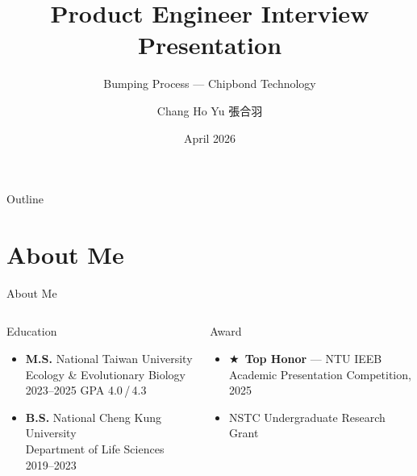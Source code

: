 \documentclass[aspectratio=169,10pt]{beamer}
\title[Bumping Product Engineer Interview]{Product Engineer Interview Presentation}
\subtitle{Bumping Process --- Chipbond Technology}
\author[Chang Ho Yu]{Chang Ho Yu \quad 張合羽}
\institute{M.S. Biological Sciences, National Taiwan University}
\date{April 2026}
\begin{document}
\begin{frame}
  \titlepage
\end{frame}

\begin{frame}{Outline}
  \tableofcontents
\end{frame}

\section{About Me}
\begin{frame}{About Me}
  \begin{columns}[T]
      \begin{block}{Education}
        \small
        \begin{itemize}
          \item \textbf{M.S.} National Taiwan University\\
                Ecology \& Evolutionary Biology\\
                {\footnotesize 2023--2025 \quad GPA 4.0\,/\,4.3}
          \item \textbf{B.S.} National Cheng Kung University\\
                Department of Life Sciences\\
                {\footnotesize 2019--2023}
        \end{itemize}
      \end{block}
      \vspace{0.1cm}
      \begin{block}{Award}
        \small
        \begin{itemize}
          \item $\bigstar$\ \textbf{Top Honor} — NTU IEEB\\
                Academic Presentation Competition, 2025
          \item NSTC Undergraduate Research Grant
        \end{itemize}
      \end{block}


\end{columns}
\end{frame}
\end{document}
